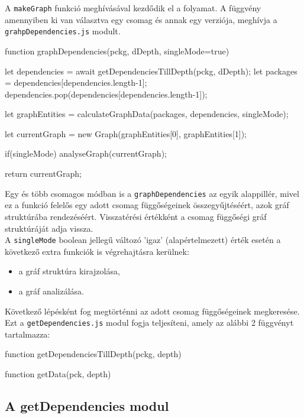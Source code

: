 
A \texttt{makeGraph} funkció meghívásával kezdődik el a folyamat. A függvény amennyiben ki van választva egy csomag és annak egy verziója, meghívja a \texttt {grahpDependencies.js} modult. 

\begin{js}
function graphDependencies(pckg, dDepth, singleMode=true){
	
  let dependencies = await getDependenciesTillDepth(pckg, dDepth);
  let packages = dependencies[dependencies.length-1];
  dependencies.pop(dependencies[dependencies.length-1]);

  let graphEntities = 
  	calculateGraphData(packages, dependencies, singleMode);
  
  let currentGraph = new Graph(graphEntities[0], graphEntities[1]);

  if(singleMode){
    analyseGraph(currentGraph);
  }

  return currentGraph;
}	
\end{js}

\pagebreak

Egy és több csomagos módban is a \texttt{graphDependencies} az egyik alappillér, mivel ez a funkció felelős egy adott csomag függőségeinek összegyűjtéséért, azok gráf struktúrába rendezéséért.
Visszatérési értékként a csomag függőségi gráf struktúráját adja vissza.\\

A \texttt{singleMode} boolean jellegű változó 'igaz' (alapértelmezett) érték esetén a következő extra funkciók is végrehajtásra kerülnek:
	\begin{itemize}
		\item a gráf struktúra kirajzolása,
		\item a gráf analizálása.
	\end{itemize}

Következő lépésként fog megtörténni az adott csomag függőségeinek megkeresése. Ezt a \texttt{getDependencies.js} modul fogja teljesíteni, amely az alábbi 2 függvényt tartalmazza:

\begin{js}
function getDependenciesTillDepth(pckg, depth)

function getData(pck, depth)
\end{js}

\subsection{A getDependencies modul}

